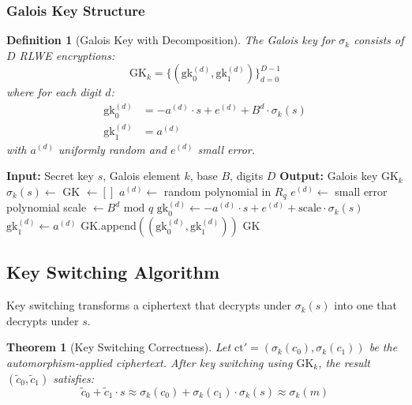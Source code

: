 \documentclass[11pt,a4paper]{article}
\newtheorem{definition}{Definition}
\newtheorem{theorem}{Theorem}
\newcommand{\bmod}{\text{ mod }}
\begin{document}
\subsubsection{Galois Key Structure}

\begin{definition}[Galois Key with Decomposition]
The Galois key for $\sigma_k$ consists of $D$ RLWE encryptions:
\[
\text{GK}_k = \{ (\text{gk}_0^{(d)}, \text{gk}_1^{(d)}) \}_{d=0}^{D-1}
\]
where for each digit $d$:
\begin{align}
\text{gk}_0^{(d)} &= -a^{(d)} \cdot s + e^{(d)} + B^d \cdot \sigma_k(s) \\
\text{gk}_1^{(d)} &= a^{(d)}
\end{align}
with $a^{(d)}$ uniformly random and $e^{(d)}$ small error.
\end{definition}

\begin{algorithm}[H]
\caption{Generate Galois Key}
\begin{algorithmic}[1]
    \State \textbf{Input:} Secret key $s$, Galois element $k$, base $B$, digits $D$
    \State \textbf{Output:} Galois key $\text{GK}_k$
    \State
    \State $\sigma_k(s) \gets$ 
    \State GK $\gets []$
    \State
        \State $a^{(d)} \gets$ random polynomial in $R_q$
        \State $e^{(d)} \gets$ small error polynomial
        \State scale $\gets B^d \bmod q$
        \State
        \State $\text{gk}_0^{(d)} \gets -a^{(d)} \cdot s + e^{(d)} + \text{scale} \cdot \sigma_k(s)$
        \State $\text{gk}_1^{(d)} \gets a^{(d)}$
        \State
        \State GK.append$((\text{gk}_0^{(d)}, \text{gk}_1^{(d)}))$
    \EndFor
    \State \Return GK
\EndFunction
\end{algorithmic}
\end{algorithm}

\subsection{Key Switching Algorithm}

Key switching transforms a ciphertext that decrypts under $\sigma_k(s)$ into one that decrypts under $s$.

\begin{theorem}[Key Switching Correctness]
Let $\text{ct}' = (\sigma_k(c_0), \sigma_k(c_1))$ be the automorphism-applied ciphertext. After key switching using $\text{GK}_k$, the result $(\tilde{c}_0, \tilde{c}_1)$ satisfies:
\[
\tilde{c}_0 + \tilde{c}_1 \cdot s \approx \sigma_k(c_0) + \sigma_k(c_1) \cdot \sigma_k(s) \approx \sigma_k(m)
\]
\end{theorem}
\end{document}

